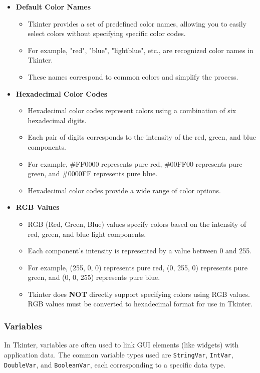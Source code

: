 \begin{itemize}
    \item \textbf{Default Color Names}
    \begin{itemize}
        \item Tkinter provides a set of predefined color names, allowing you to easily select colors without specifying specific color codes.
        \item For example, "red", "blue", "lightblue", etc., are recognized color names in Tkinter.
        \item These names correspond to common colors and simplify the process.
    \end{itemize}

    \item \textbf{Hexadecimal Color Codes}
    \begin{itemize}
        \item Hexadecimal color codes represent colors using a combination of six hexadecimal digits.
        \item Each pair of digits corresponds to the intensity of the red, green, and blue components.
        \item For example, \#FF0000 represents pure red, \#00FF00 represents pure green, and \#0000FF represents pure blue.
        \item Hexadecimal color codes provide a wide range of color options.
    \end{itemize}

    \item \textbf{RGB Values}
    \begin{itemize}
        \item RGB (Red, Green, Blue) values specify colors based on the intensity of red, green, and blue light components.
        \item Each component's intensity is represented by a value between 0 and 255.
        \item For example, (255, 0, 0) represents pure red, (0, 255, 0) represents pure green, and (0, 0, 255) represents pure blue.
        \item Tkinter does \textbf{NOT} directly support specifying colors using RGB values. RGB values must be converted to hexadecimal format for use in Tkinter.

    \end{itemize}
\end{itemize}

\subsubsection{Variables}
In Tkinter, variables are often used to link GUI elements (like widgets) with application data. The common variable types used are \texttt{StringVar}, \texttt{IntVar}, \texttt{DoubleVar}, and \texttt{BooleanVar}, each corresponding to a specific data type.\\

